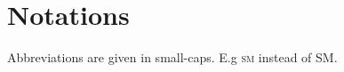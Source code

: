 \documentclass[../../index.tex]{subfiles}
\begin{document}
\chapter*{Notations}

\begin{description}
  \item Abbreviations are given in small-caps. E.g \textsc{sm} instead of SM.
\end{description}
\end{document}
